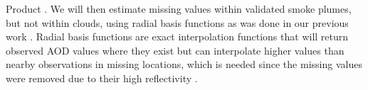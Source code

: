 \documentclass[authoryear]{elsarticle}
\begin{document}

\noindent Product  \citep{NOAAHazMap2017}. We will then estimate missing values within validated smoke plumes, but not within clouds, using radial basis functions as was done in our previous work \citep{Reid2015}. Radial basis functions are exact interpolation functions that will return observed AOD values where they exist but can interpolate higher values than nearby observations in missing locations, which is needed since the missing values were removed due to their high reflectivity \citep{Reid2015}.
\end{document}
